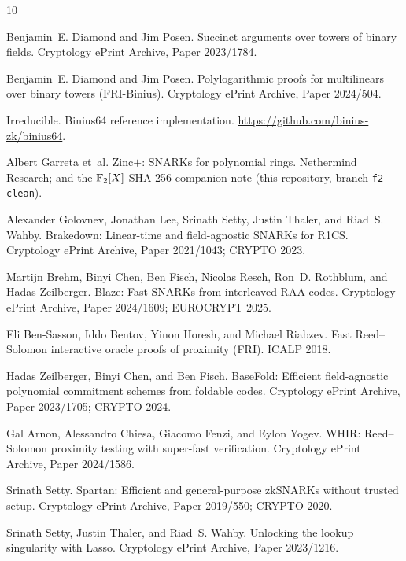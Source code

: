\begin{thebibliography}{10}

Benjamin~E. Diamond and Jim Posen.
\newblock Succinct arguments over towers of binary fields.
\newblock Cryptology ePrint Archive, Paper 2023/1784.

Benjamin~E. Diamond and Jim Posen.
\newblock Polylogarithmic proofs for multilinears over binary towers
  (FRI-Binius).
\newblock Cryptology ePrint Archive, Paper 2024/504.

Irreducible.
\newblock Binius64 reference implementation.
\newblock \url{https://github.com/binius-zk/binius64}.

Albert Garreta et~al.
\newblock Zinc$+$: SNARKs for polynomial rings.
\newblock Nethermind Research; and the $\mathbb{F}_2[X]$ SHA-256 companion note
  (this repository, branch \texttt{f2-clean}).

Alexander Golovnev, Jonathan Lee, Srinath Setty, Justin Thaler, and
  Riad~S. Wahby.
\newblock Brakedown: Linear-time and field-agnostic SNARKs for R1CS.
\newblock Cryptology ePrint Archive, Paper 2021/1043; CRYPTO 2023.

Martijn Brehm, Binyi Chen, Ben Fisch, Nicolas Resch, Ron~D. Rothblum, and
  Hadas Zeilberger.
\newblock Blaze: Fast SNARKs from interleaved RAA codes.
\newblock Cryptology ePrint Archive, Paper 2024/1609; EUROCRYPT 2025.

Eli Ben-Sasson, Iddo Bentov, Yinon Horesh, and Michael Riabzev.
\newblock Fast Reed--Solomon interactive oracle proofs of proximity (FRI).
\newblock ICALP 2018.

Hadas Zeilberger, Binyi Chen, and Ben Fisch.
\newblock BaseFold: Efficient field-agnostic polynomial commitment schemes
  from foldable codes.
\newblock Cryptology ePrint Archive, Paper 2023/1705; CRYPTO 2024.

Gal Arnon, Alessandro Chiesa, Giacomo Fenzi, and Eylon Yogev.
\newblock WHIR: Reed--Solomon proximity testing with super-fast
  verification.
\newblock Cryptology ePrint Archive, Paper 2024/1586.

Srinath Setty.
\newblock Spartan: Efficient and general-purpose zkSNARKs without trusted
  setup.
\newblock Cryptology ePrint Archive, Paper 2019/550; CRYPTO 2020.

Srinath Setty, Justin Thaler, and Riad~S. Wahby.
\newblock Unlocking the lookup singularity with Lasso.
\newblock Cryptology ePrint Archive, Paper 2023/1216.

\end{thebibliography}
